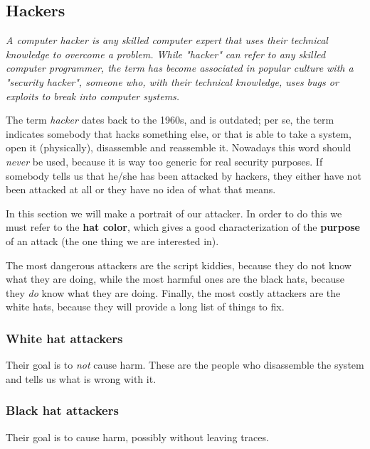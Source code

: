 
\subsection{Hackers}
\begin{center}
\textit{A computer hacker is any skilled computer expert that uses their technical knowledge to overcome a problem. While "hacker" can refer to any skilled computer programmer, the term has become associated in popular culture with a "security
hacker", someone who, with their technical knowledge, uses bugs or exploits to break into computer systems.}
\end{center}

The term \textit{hacker} dates back to the 1960s, and is outdated;  per se, the term indicates somebody that hacks something else, or that is able to take a system, open it (physically), disassemble and reassemble it. Nowadays this word should \textit{never} be used, because it is way too generic for real security purposes. If somebody tells us that he/she has been attacked by hackers, they either have not been attacked at all or they have no idea of what that means.

In this section we will make a portrait of our attacker. In order to do this we must refer to the \textbf{hat color}, which gives a good characterization of the \textbf{purpose} of an attack (the one thing we are interested in).

The most dangerous attackers are the script kiddies, because they do not know what they are doing, while the most harmful ones are the black hats, because they \textit{do} know what they are doing. Finally, the most costly attackers are the white hats, because they will provide a long list of things to fix.


\subsubsection*{White hat attackers}
Their goal is to \textit{not} cause harm. These are the people who disassemble the system and tells us what is wrong with it.


\subsubsection*{Black hat attackers}
Their goal is to cause harm, possibly without leaving traces.

